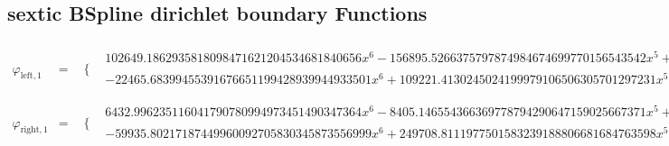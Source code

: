 \documentclass{article}
\begin{document}
 \begin{landscape}
 \subsection{sextic BSpline dirichlet boundary Functions}
 \begin{eqnarray*}
 \varphi_{\text{left},1} & = & \begin{array}{cc}
 \{ & 
\begin{array}{cc}
 102649.1862935818098471621204534681840656 x^6-156895.5266375797874984674699770156543542 x^5+91818.42648538611844540964455045045118192 x^4-25712.97828289558209674326744593943264030 x^3+3445.647413608603430975125157850890442093 x^2-175.3966580264086972945724661761787184603 x & x\geq 0\land x<\frac{1}{2} \\
 -22465.68399455391676651199428939944933501 x^6+109221.4130245024199979106506305701297231 x^5-218963.3233773576215812994474486816511123 x^4+231490.8233242187503121428259088997096494 x^3-135987.9066346574383395282378479550069963 x^2+42043.67565090051267734450034748353688826 x-5338.997993052706300058297300917268817113 & x\geq \frac{1}{2}\land x<1
\end{array}

\end{array}\\ 
\varphi_{\text{right},1} & = & \begin{array}{cc}
 \{ & 
\begin{array}{cc}
 6432.996235116041790780994973451490347364 x^6-8405.146554366369778794290647159025667371 x^5+3760.713099610489913319052425315307555985 x^4-659.6805517558841401021923283720511284328 x^3+36.15011052579801880419199462033276154860 x^2 & x\geq 0\land x<\frac{1}{2} \\
 -59935.80217187449960092705830345873556999 x^6+249708.8111977501583239188806681684763598 x^5-426576.2810673392200771194167350430915021 x^4+382483.2166680030314255958657332511516383 x^3-189914.5580958755464807750265848863925963 x^2+49545.57027883132429937230356684934578785 x-5310.956809495247890065548344880754117566 & x\geq \frac{1}{2}\land x<1
\end{array}

\end{array}\end{eqnarray*}
\end{landscape}
\end{document}
